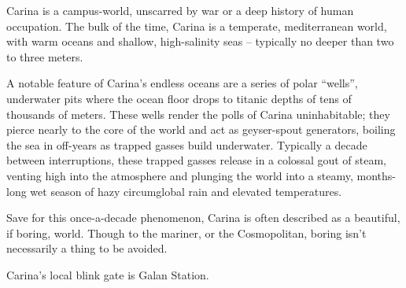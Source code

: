                                                                                                            


Carina is a campus-world, unscarred by war or a deep history of human occupation. The bulk of  
the time, Carina is a temperate, mediterranean world, with warm oceans and shallow, high-salinity  
seas -- typically no deeper than two to three meters.   

A notable feature of Carina’s endless oceans are a series of polar “wells”, underwater pits where  
the ocean floor drops to titanic depths of tens of thousands of meters. These wells render the  
polls of Carina uninhabitable; they pierce nearly to the core of the world and act as geyser-spout  
generators, boiling the sea in off-years as trapped gasses build underwater. Typically a decade  
between interruptions, these trapped gasses release in a colossal gout of steam, venting high into  
the atmosphere and plunging the world into a steamy, months-long wet season of hazy  
circumglobal rain and elevated temperatures.  

Save for this once-a-decade phenomenon, Carina is often described as a beautiful, if boring,  
world. Though to the mariner, or the Cosmopolitan, boring isn’t necessarily a thing to be avoided.   

Carina’s local blink gate is Galan Station.    

                                                                                                            
